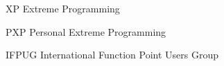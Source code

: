 \begin{siglas}
  \item[XP] Extreme Programming
  \item[PXP] Personal Extreme Programming
  \item[IFPUG] International Function Point Users Group
\end{siglas}
